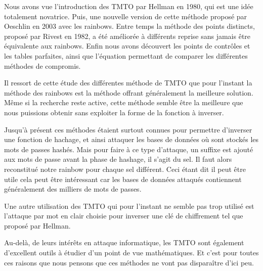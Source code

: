 
	Nous avons vue l'introduction des \gls{TMTO} par Hellman en 1980, qui est une idée totalement novatrice. Puis, une nouvelle version de cette méthode proposé par Oeschlin en 2003 avec les \glspl{rainbow}. Entre temps la méthode des points distincts, proposé par Rivest en 1982, a été améliorée à différents reprise sans jamais être équivalente aux \glspl{rainbow}. Enfin nous avons découvert les points de contrôles et les tables parfaites, ainsi que l'équation permettant de comparer les différentes méthodes de compromis.

	\bigskip

	Il ressort de cette étude des différentes méthode de \gls{TMTO} que pour l'instant la méthode des \glspl{rainbow} est la méthode offrant généralement la meilleure solution. Même si la recherche reste active, cette méthode semble être la meilleure que nous puissions obtenir sans exploiter la forme de la fonction à inverser.

	\bigskip

	Jusqu'à présent ces méthodes étaient surtout connues pour permettre d'inverser une fonction de hachage, et ainsi attaquer les bases de données où sont stockés les mots de passes hashés. Mais pour faire à ce type d'attaque, un suffixe est ajouté aux mots de passe avant la phase de hashage, il s'agit du sel. Il faut alors reconstitué notre \gls{rainbow} pour chaque sel différent. Ceci étant dit il peut être utile cela peut être intéressant car les bases de données attaqués contiennent généralement des milliers de mots de passes.

	\bigskip

	Une autre utilisation des \gls{TMTO} qui pour l'instant ne semble pas trop utilisé est l'attaque par mot en clair choisie pour inverser une clé de chiffrement tel que proposé par Hellman.

	\bigskip

	Au-delà, de leurs intérêts en attaque informatique, les \gls{TMTO} sont également d'excellent outils à étudier d'un point de vue mathématiques. Et c'est pour toutes ces raisons que nous pensons que ces méthodes ne vont pas disparaître d'ici peu. 

\endinput{}
